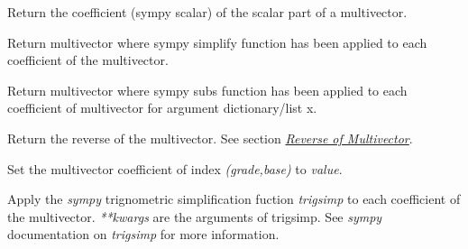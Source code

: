 \documentclass[letterpaper,10pt,english]{sphinxmanual}
\begin{document}

\begin{fulllineitems}
\label{GA:scalar}
Return the coefficient (sympy scalar) of the scalar part of a
multivector.

\end{fulllineitems}


\begin{fulllineitems}
\label{GA:simplify}
Return multivector where sympy simplify function has been applied to
each coefficient of the multivector.

\end{fulllineitems}


\begin{fulllineitems}
\label{GA:subs}
Return multivector where sympy subs function has been applied to each
coefficient of multivector for argument dictionary/list x.

\end{fulllineitems}


\begin{fulllineitems}
\label{GA:rev}
Return the reverse of the multivector.  See section {\hyperref[GA:reverse]{\emph{Reverse of Multivector}}}.

\end{fulllineitems}


\begin{fulllineitems}
\label{GA:set_coef}
Set the multivector coefficient of index \emph{(grade,base)} to \emph{value}.

\end{fulllineitems}


\begin{fulllineitems}
\label{GA:trigsimp}
Apply the \emph{sympy} trignometric simplification fuction \emph{trigsimp} to
each coefficient of the multivector. \emph{**kwargs} are the arguments of
trigsimp.  See \emph{sympy} documentation on \emph{trigsimp} for more information.

\end{fulllineitems}
\end{document}

